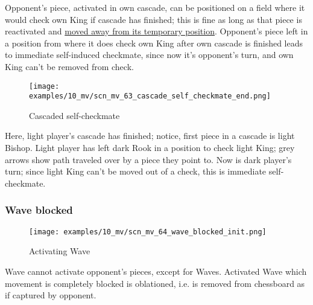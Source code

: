 \vspace*{-0.4\baselineskip}
Opponent's piece, activated in own cascade, can be positioned on a field where
it would check own King if cascade has finished; this is fine as long as that piece
is reactivated and
\hyperref[fig:scn_mv_47_cascaded_piece_check_init]{moved away from its temporary position}.
Opponent's piece left in a position from where it does check own King after own cascade
is finished leads to immediate self-induced checkmate, since now it's opponent's turn,
and own King can't be removed from check.

\clearpage %

\vspace*{-2.1\baselineskip}
\noindent
\begin{figure}[h]
\texttt{[image: examples/10\_mv/scn\_mv\_63\_cascade\_self\_checkmate\_end.png]}
\caption{Cascaded self-checkmate}
\label{fig:scn_mv_63_cascade_self_checkmate_end}
\end{figure}

Here, light player's cascade has finished; notice, first piece in a cascade is light
Bishop. Light player has left dark Rook in a position to check light King; grey arrows
show path traveled over by a piece they point to. Now is dark player's turn; since
light King can't be moved out of a check, this is immediate self-checkmate.

\clearpage %

\subsubsection*{Wave blocked}
\label{sec:Miranda's veil/Wave/Cascading opponent/Wave blocked}

\vspace*{-1.4\baselineskip}
\noindent
\begin{figure}[h]
\texttt{[image: examples/10\_mv/scn\_mv\_64\_wave\_blocked\_init.png]}
\caption{Activating Wave}
\label{fig:scn_mv_64_wave_blocked_init}
\end{figure}

Wave cannot activate opponent's pieces, except for Waves. Activated Wave which movement
is completely blocked is oblationed, i.e. is removed from chessboard as if captured by
opponent.


